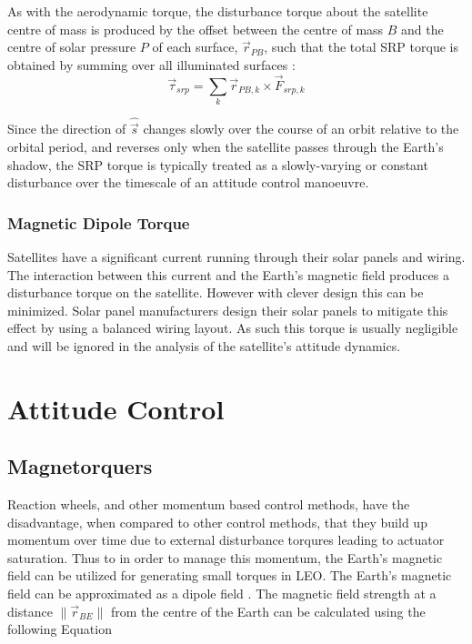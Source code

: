 As with the aerodynamic torque, the disturbance torque about the satellite centre of mass is produced by the offset between the centre of mass $B$ and the centre of solar pressure $P$ of each surface, $\vec{r}_{PB}$, such that the total SRP torque is obtained by summing over all illuminated surfaces \cite{wieSpaceVehicleDynamics1998}:
\begin{equation}
    \vec{\tau}_{srp} = \sum_{k} \vec{r}_{PB,k} \times \vec{F}_{srp,k}
    \label{eq:srp_torque}
\end{equation}

Since the direction of $\hat{\vec{s}}$ changes slowly over the course of an orbit relative to the orbital period, and reverses only when the satellite passes through the Earth's shadow, the SRP torque is typically treated as a slowly-varying or constant disturbance over the timescale of an attitude control manoeuvre.

\subsubsection{Magnetic Dipole Torque}
Satellites have a significant current running through their solar panels and wiring. The interaction between this current and the Earth's magnetic field produces a disturbance torque on the satellite. However with clever design this can be minimized. Solar panel manufacturers design their solar panels to mitigate this effect by using a balanced wiring layout. As such this torque is usually negligible and will be ignored in the analysis of the satellite's attitude dynamics.

\section{Attitude Control}

\subsection{Magnetorquers}
Reaction wheels, and other momentum based control methods, have the disadvantage, when compared to other control methods, that they build up momentum over time due to external disturbance torqures leading to actuator saturation. Thus to in order to manage this momentum, the Earth's magnetic field can be utilized for generating small torques in LEO. The Earth's magnetic field can be approximated as a dipole field \cite{sidiAttitudeDynamicsKinematics1997}. The magnetic field strength at a distance $\|\vec{r}_{BE}\|$ from the centre of the Earth can be calculated using the following Equation 

